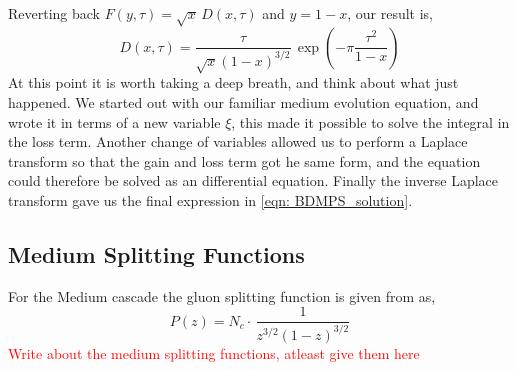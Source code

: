 \documentclass[main.tex]{subfiles}
\begin{document}
Reverting back \(F(y,\tau) = \sqrt{x}\, D(x,\tau)\) and \(y = 1-x\), our result is, 
\begin{equation}\label{eqn: BDMPS_solution}
    D(x,\tau ) = \frac{\tau}{\sqrt{x}(1-x)^{3/2}}\, \exp\left(-\pi \frac{\tau^2}{1-x}\right)
\end{equation}
At this point it is worth taking a deep breath, and think about what just happened. We started out with our familiar medium evolution equation, and wrote it in terms of a new variable \(\xi\), this made it possible to solve the integral in the loss term. Another change of variables allowed us to perform a Laplace transform so that the gain and loss term got he same form, and the equation could therefore be solved as an differential equation. Finally the inverse Laplace transform gave us the final expression in \autoref{eqn: BDMPS_solution}.

\subsection{Medium Splitting Functions}
For the Medium cascade the gluon splitting function is given from \cite{Energy_flow_medium_cascade_2016} as, 
\begin{equation}\label{eqn: ggg_medium_splitting_function}
    P(z) = N_c \cdot \, \frac{1}{z^{3/2}(1-z)^{3/2}}
\end{equation}
\textcolor{red}{Write about the medium splitting functions, atleast give them here}
\end{document}
